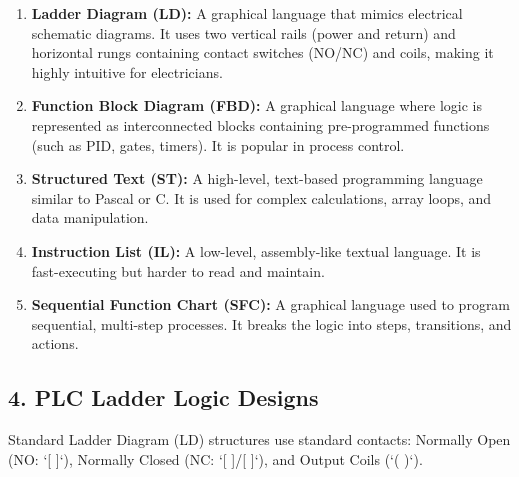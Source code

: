 \begin{enumerate}
  \item \textbf{Ladder Diagram (LD):} A graphical language that mimics electrical schematic diagrams. It uses two vertical rails (power and return) and horizontal rungs containing contact switches (NO/NC) and coils, making it highly intuitive for electricians.
  \item \textbf{Function Block Diagram (FBD):} A graphical language where logic is represented as interconnected blocks containing pre-programmed functions (such as PID, gates, timers). It is popular in process control.
  \item \textbf{Structured Text (ST):} A high-level, text-based programming language similar to Pascal or C. It is used for complex calculations, array loops, and data manipulation.
  \item \textbf{Instruction List (IL):} A low-level, assembly-like textual language. It is fast-executing but harder to read and maintain.
  \item \textbf{Sequential Function Chart (SFC):} A graphical language used to program sequential, multi-step processes. It breaks the logic into steps, transitions, and actions.
\end{enumerate}


\subsection{4. PLC Ladder Logic Designs}
Standard Ladder Diagram (LD) structures use standard contacts: Normally Open (NO: `[ ]`), Normally Closed (NC: `[ ]/[ ]`), and Output Coils (`( )`).

